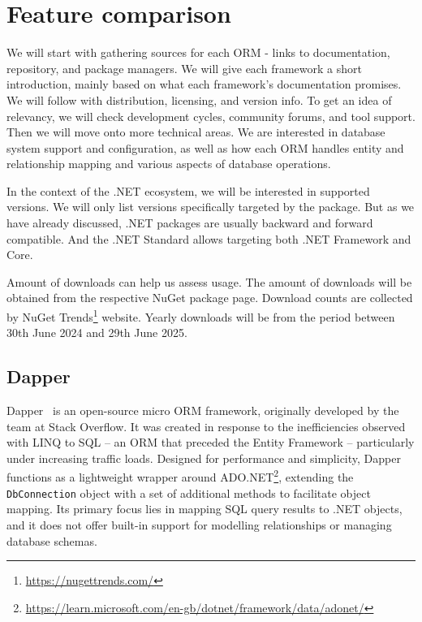 \section{Feature comparison}
We will start with gathering sources for each ORM - links to documentation, repository, and package managers. We will give each framework a short introduction, mainly based on what each framework's documentation promises. We will follow with distribution, licensing, and version info. To get an idea of relevancy, we will check development cycles, community forums, and tool support. Then we will move onto more technical areas. We are interested in database system support and configuration, as well as how each ORM handles entity and relationship mapping and various aspects of database operations.

In the context of the .NET ecosystem, we will be interested in supported versions. We will only list versions specifically targeted by the package. But as we have already discussed, .NET packages are usually backward and forward compatible. And the .NET Standard allows targeting both .NET Framework and Core.

Amount of downloads can help us assess usage. The amount of downloads will be obtained from the respective NuGet package page. Download counts are collected by NuGet Trends\footnote{\url{https://nugettrends.com/}} website. Yearly downloads will be from the period between 30th June 2024 and 29th June 2025.

\subsection{Dapper}\label{sec:feat_dapper}

Dapper~\cite{Dapper,DapperRepo} is an open-source micro ORM framework, originally developed by the team at Stack Overflow. It was created in response to the inefficiencies observed with LINQ to SQL -- an ORM that preceded the Entity Framework -- particularly under increasing traffic loads. Designed for performance and simplicity, Dapper functions as a lightweight wrapper around ADO.NET\footnote{\url{https://learn.microsoft.com/en-gb/dotnet/framework/data/adonet/}}, extending the \texttt{DbConnection} object with a set of additional methods to facilitate object mapping. Its primary focus lies in mapping SQL query results to .NET objects, and it does not offer built-in support for modelling relationships or managing database schemas.

